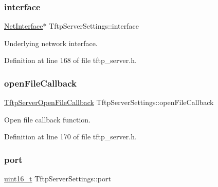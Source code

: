 \mbox{\label{structTftpServerSettings_ada45e3b84aedec470a0d6fa4c2ff53ce}} 
\subsubsection{\texorpdfstring{interface}{interface}}
{\footnotesize\ttfamily \hyperlink{net_8h_a2234db8911a1148c9159979d8f5e0d6b}{Net\+Interface}$\ast$ Tftp\+Server\+Settings\+::interface}



Underlying network interface. 



Definition at line 168 of file tftp\+\_\+server.\+h.

\mbox{\label{structTftpServerSettings_acb6820c295cca83e7d6559977d548835}} 
\subsubsection{\texorpdfstring{open\+File\+Callback}{openFileCallback}}
{\footnotesize\ttfamily \hyperlink{tftp__server_8h_a4cfed7d273d525cc9cc915c2e1f77018}{Tftp\+Server\+Open\+File\+Callback} Tftp\+Server\+Settings\+::open\+File\+Callback}



Open file callback function. 



Definition at line 170 of file tftp\+\_\+server.\+h.

\mbox{\label{structTftpServerSettings_ac188b0c3119ad1c1ebeec4750e9123c8}} 
\subsubsection{\texorpdfstring{port}{port}}
{\footnotesize\ttfamily \hyperlink{stdint_8h_a273cf69d639a59973b6019625df33e30}{uint16\+\_\+t} Tftp\+Server\+Settings\+::port}



